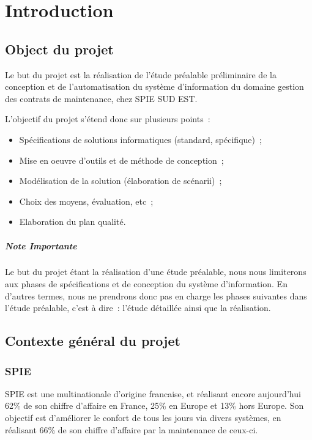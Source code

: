 \chapter{Introduction}

\section{Object du projet}

Le but du projet est la réalisation de l’étude préalable préliminaire de la conception et de
l’automatisation du système d’information du domaine gestion des contrats de maintenance, chez SPIE SUD EST.

L'objectif du projet s'étend donc sur plusieurs points~:
\begin{itemize}
    \item Spécifications de solutions informatiques (standard, spécifique)~;
    \item Mise en oeuvre d’outils et de méthode de conception~;
    \item Modélisation de la solution (élaboration de scénarii)~;
    \item Choix des moyens, évaluation, etc~;
    \item Elaboration du plan qualité.
\end{itemize}

\paragraph{Note Importante} Le but du projet étant la réalisation d'une étude préalable, nous nous
limiterons aux phases de spécifications et de conception du système d’information. En d'autres termes,
nous ne prendrons donc pas en charge les phases suivantes dans l’étude préalable, c’est à dire~:
l’étude détaillée ainsi que la réalisation.


\section{Contexte général du projet}

\subsection{SPIE}

SPIE est une multinationale d'origine francaise, et réalisant encore aujourd'hui 62\% de son
chiffre d'affaire en France, 25\% en Europe et 13\% hors Europe. Son objectif est d'améliorer le confort
de tous les jours via divers systèmes, en réalisant 66\% de son chiffre d'affaire par la maintenance de ceux-ci.

